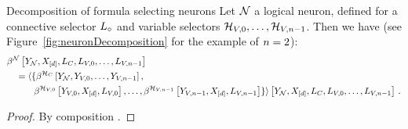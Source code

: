 \begin{theorem}{Decomposition of formula selecting neurons}
    \label{the:neuronDecomposition}
    Let $\mathcal{N}$ a logical neuron, defined for a connective selector $L_{\circ}$ and variable selectors $\mathcal{H}_{V,0},\ldots,\mathcal{H}_{V,n-1}$.
    Then we have (see Figure~\ref{fig:neuronDecomposition} for the example of $n=2$):
    \begin{align*}
        &\beta^{\mathcal{N}}\left[Y_{\mathcal{N}},X_{[d]},L_{C},L_{V,0},\ldots,L_{V,n-1}\right] \\
        &\quad = \langle\{\beta^{\mathcal{H}_{C}}\left[
            Y_{\mathcal{N}},Y_{V,0},\ldots,Y_{V,n-1}\right], \\
        & \quad\quad\quad\beta^{\mathcal{H}_{V,0}}\left[
            Y_{V,0},X_{[d]},L_{V,0}\right],\ldots,
        \beta^{\mathcal{H}_{V,n-1}}\left[
            Y_{V,n-1},X_{[d]},L_{V,n-1}\right]
        \} \rangle
        \left[Y_{\mathcal{N}},X_{[d]}, L_{C},L_{V,0},\ldots,L_{V,n-1}\right] \, .
    \end{align*}
\end{theorem}
\begin{proof}
    By composition .
\end{proof}




